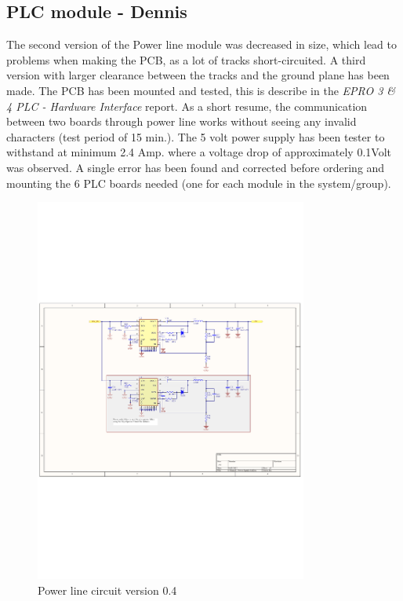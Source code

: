 \subsection{PLC module - Dennis}
The second version of the Power line module was decreased in size, which lead to problems when making the PCB, as a lot of tracks short-circuited. A third version with larger clearance between the tracks and the ground plane has been made. The PCB has been mounted and tested, this is describe in the \textit{EPRO 3 \& 4 PLC - Hardware Interface} report. As a short resume, the communication between two boards through power line works without seeing any invalid characters (test period of 15 min.). The 5 volt power supply has been tester to withstand at minimum 2.4 Amp. where a voltage drop of approximately 0.1Volt was observed. 
A single error has been found and corrected before ordering and mounting the 6 PLC boards needed (one for each module in the system/group).

\begin{figure}[H]
	\begin{centering}
		 \includegraphics[width=0.8\textwidth,page=2,angle=0]{images/SIG60_v0_4}
		\caption{Power line circuit version 0.4}
	\end{centering}
\end{figure}

